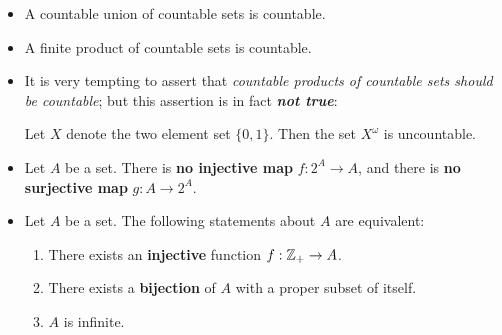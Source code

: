 \documentclass[11pt]{article}
\begin{document}
\begin{itemize}
\item \begin{proposition}
A countable union of countable sets is countable.
\end{proposition}

\item \begin{proposition}
A finite product of countable sets is countable.
\end{proposition}

\item It is very tempting to assert that \emph{countable products of countable sets should be countable}; but this assertion is in fact \emph{\textbf{not true}}:
\begin{theorem}
Let $X$ denote the two element set $\{0, 1\}$. Then the set $X^{\omega}$ is  uncountable.
\end{theorem}

\item \begin{theorem}
Let $A$ be a set. There is \textbf{no injective map} $f: 2^A  \rightarrow A$, and there is \textbf{no surjective map} $g: A  \rightarrow 2^A$.
\end{theorem}

\item \begin{proposition}
Let $A$ be a set. The following statements about $A$ are equivalent:
\begin{enumerate}
\item There exists an \textbf{injective} function $f : {\mathbb Z}_{+} \rightarrow A$.
\item There exists a \textbf{bijection} of $A$ with a proper subset of itself.
\item $A$ is infinite.
\end{enumerate}
\end{proposition}
\end{itemize}
\end{document}
